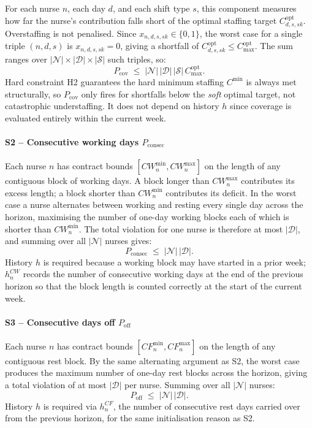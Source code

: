 \documentclass[11pt]{article}
\begin{document}
For each nurse $n$, each day $d$, and each shift type $s$, this
component measures how far the nurse's contribution falls short of the
optimal staffing target $C^{\text{opt}}_{d,s,sk}$. Overstaffing is not
penalised. Since $x_{n,d,s,sk} \in \{0,1\}$, the worst case for a
single triple $(n,d,s)$ is $x_{n,d,s,sk} = 0$, giving a shortfall of
$C^{\text{opt}}_{d,s,sk} \leq C^{\text{opt}}_{\max}$. The sum ranges
over $|\mathcal{N}| \times |\mathcal{D}| \times |\mathcal{S}|$ such
triples, so:
\[
  P_{\text{cov}}
  \;\leq\;
  |\mathcal{N}|\,|\mathcal{D}|\,|\mathcal{S}|\,C^{\text{opt}}_{\max}.
\]
Hard constraint H2 guarantees the hard minimum staffing $C^{\min}$ is
always met structurally, so $P_{\text{cov}}$ only fires for shortfalls
below the \emph{soft} optimal target, not catastrophic understaffing.
It does not depend on history $h$ since coverage is evaluated entirely
within the current week.

\paragraph{S2 -- Consecutive working days $P_{\text{consec}}$}

Each nurse $n$ has contract bounds $[CW^{\min}_n, CW^{\max}_n]$ on the
length of any contiguous block of working days. A block longer than
$CW^{\max}_n$ contributes its excess length; a block shorter than
$CW^{\min}_n$ contributes its deficit. In the worst case a nurse
alternates between working and resting every single day across the
horizon, maximising the number of one-day working blocks each of which
is shorter than $CW^{\min}_n$. The total violation for one nurse is
therefore at most $|\mathcal{D}|$, and summing over all
$|\mathcal{N}|$ nurses gives:
\[
  P_{\text{consec}} \;\leq\; |\mathcal{N}|\,|\mathcal{D}|.
\]
History $h$ is required because a working block may have started in a
prior week; $h^{CW}_n$ records the number of consecutive working days
at the end of the previous horizon so that the block length is counted
correctly at the start of the current week.

\paragraph{S3 -- Consecutive days off $P_{\text{off}}$}

Each nurse $n$ has contract bounds $[CF^{\min}_n, CF^{\max}_n]$ on the
length of any contiguous rest block. By the same alternating argument
as S2, the worst case produces the maximum number of one-day rest
blocks across the horizon, giving a total violation of at most
$|\mathcal{D}|$ per nurse. Summing over all $|\mathcal{N}|$ nurses:
\[
  P_{\text{off}} \;\leq\; |\mathcal{N}|\,|\mathcal{D}|.
\]
History $h$ is required via $h^{CF}_n$, the number of consecutive rest
days carried over from the previous horizon, for the same
initialisation reason as S2.
\end{document}
